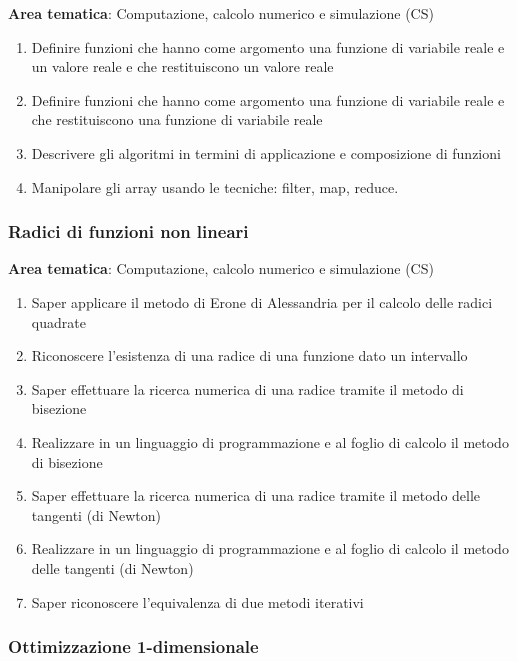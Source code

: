 \noindent\textbf{Area tematica}: Computazione, calcolo numerico e simulazione (CS)

    
\begin{enumerate}
  \item Definire funzioni che hanno come argomento una funzione di variabile reale e un valore reale e che restituiscono un valore reale
  \item Definire funzioni che hanno come argomento una funzione di variabile reale e che restituiscono una funzione di variabile reale
  \item Descrivere gli algoritmi in termini di applicazione e composizione di funzioni
  \item Manipolare gli array usando le tecniche: filter, map, reduce.
\end{enumerate}

\subsubsection[Radici]{Radici di funzioni non lineari}
\label{sec:radici}

\noindent\textbf{Area tematica}: Computazione, calcolo numerico e simulazione (CS)

    
\begin{enumerate}
  \item Saper applicare il metodo di Erone di Alessandria per il calcolo delle radici quadrate
  \item Riconoscere l'esistenza di una radice di una funzione dato un intervallo
  \item Saper effettuare la ricerca numerica di una radice tramite il metodo di bisezione
  \item Realizzare in un linguaggio di programmazione e al foglio di calcolo il metodo di bisezione
  \item Saper effettuare la ricerca numerica di una radice tramite il metodo delle tangenti (di Newton)
  \item Realizzare in un linguaggio di programmazione e al foglio di calcolo il metodo delle tangenti (di Newton)
  \item Saper riconoscere l'equivalenza di due metodi iterativi
\end{enumerate}

\subsubsection[Ottimizzazione]{Ottimizzazione 1-dimensionale}
\label{sec:ottimizzazione}

